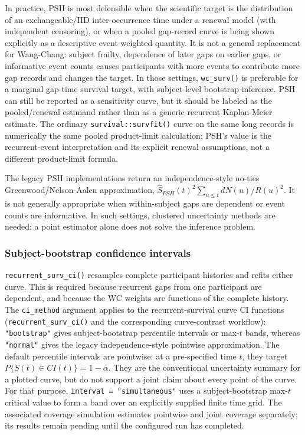 \documentclass[
  12pt]{article}
\begin{document}
In practice, PSH is most defensible when the scientific target is the
distribution of an exchangeable/IID inter-occurrence time under a
renewal model (with independent censoring), or when a pooled gap-record
curve is being shown explicitly as a descriptive event-weighted
quantity. It is not a general replacement for Wang-Chang: subject
frailty, dependence of later gaps on earlier gaps, or informative event
counts causes participants with more events to contribute more gap
records and changes the target. In those settings, \texttt{wc\_surv()}
is preferable for a marginal gap-time survival target, with
subject-level bootstrap inference. PSH can still be reported as a
sensitivity curve, but it should be labeled as the pooled/renewal
estimand rather than as a generic recurrent Kaplan-Meier estimate. The
ordinary \texttt{survival::survfit()} curve on the same long records is
numerically the same pooled product-limit calculation; PSH's value is
the recurrent-event interpretation and its explicit renewal assumptions,
not a different product-limit formula.

The legacy PSH implementations return an independence-style no-ties
Greenwood/Nelson-Aalen approximation,
\(\widehat S_{PSH}(t)^2\sum_{u\leq t}dN(u)/R(u)^2\). It is not generally
appropriate when within-subject gaps are dependent or event counts are
informative. In such settings, clustered uncertainty methods are needed;
a point estimator alone does not solve the inference problem.

\subsubsection{Subject-bootstrap confidence
intervals}\label{subject-bootstrap-confidence-intervals}

\texttt{recurrent\_surv\_ci()} resamples complete participant histories
and refits either curve. This is required because recurrent gaps from
one participant are dependent, and because the WC weights are functions
of the complete history. The \texttt{ci\_method} argument applies to the
recurrent-survival curve CI functions (\texttt{recurrent\_surv\_ci()}
and the corresponding curve-contrast workflow): \texttt{"bootstrap"}
gives subject-bootstrap percentile intervals or max-\(t\) bands, whereas
\texttt{"normal"} gives the legacy independence-style pointwise
approximation. The default percentile intervals are pointwise: at a
pre-specified time \(t\), they target \(P\{S(t)\in CI(t)\}=1-\alpha\).
They are the conventional uncertainty summary for a plotted curve, but
do not support a joint claim about every point of the curve. For that
purpose, \texttt{interval\ =\ "simultaneous"} uses a subject-bootstrap
max-\(t\) critical value to form a band over an explicitly supplied
finite time grid. The associated coverage simulation estimates pointwise
and joint coverage separately; its results remain pending until the
configured run has completed.
\end{document}
